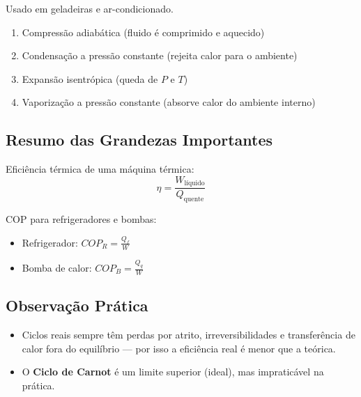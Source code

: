 Usado em geladeiras e ar-condicionado.

\begin{enumerate}
  \item Compressão adiabática (fluido é comprimido e aquecido)
  \item Condensação a pressão constante (rejeita calor para o ambiente)
  \item Expansão isentrópica (queda de \(P\) e \(T\))
  \item Vaporização a pressão constante (absorve calor do ambiente interno)
\end{enumerate}

\subsection*{Resumo das Grandezas Importantes}

Eficiência térmica de uma máquina térmica:
\[
\eta = \frac{W_{\text{líquido}}}{Q_{\text{quente}}}
\]

COP para refrigeradores e bombas:
\begin{itemize}
  \item Refrigerador: \(COP_R = \frac{Q_f}{W}\)
  \item Bomba de calor: \(COP_B = \frac{Q_q}{W}\)
\end{itemize}

\subsection*{Observação Prática}

\begin{itemize}
  \item \colorbox{green!30}{Ciclos reais sempre têm perdas por atrito, irreversibilidades} e transferência de calor fora do equilíbrio — por isso a eficiência real é menor que a teórica.
  \item O \colorbox{green!30}{\textbf{Ciclo de Carnot} é um limite superior (ideal), mas impraticável na prática.}
\end{itemize}

